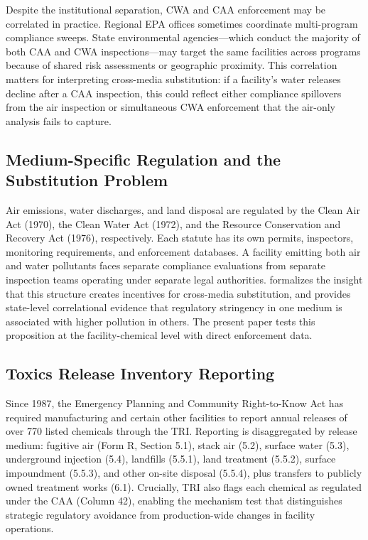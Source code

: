 \documentclass[12pt]{article}
\begin{document}
Despite the institutional separation, CWA and CAA enforcement may be correlated in practice. Regional EPA offices sometimes coordinate multi-program compliance sweeps. State environmental agencies---which conduct the majority of both CAA and CWA inspections---may target the same facilities across programs because of shared risk assessments or geographic proximity. This correlation matters for interpreting cross-media substitution: if a facility's water releases decline after a CAA inspection, this could reflect either compliance spillovers from the air inspection or simultaneous CWA enforcement that the air-only analysis fails to capture.

\subsection{Medium-Specific Regulation and the Substitution Problem}

Air emissions, water discharges, and land disposal are regulated by the Clean Air Act (1970), the Clean Water Act (1972), and the Resource Conservation and Recovery Act (1976), respectively. Each statute has its own permits, inspectors, monitoring requirements, and enforcement databases. A facility emitting both air and water pollutants faces separate compliance evaluations from separate inspection teams operating under separate legal authorities. \citet{sigman1996crossmedia} formalizes the insight that this structure creates incentives for cross-media substitution, and \citet{sigman2001crossmedia} provides state-level correlational evidence that regulatory stringency in one medium is associated with higher pollution in others. The present paper tests this proposition at the facility-chemical level with direct enforcement data.

\subsection{Toxics Release Inventory Reporting}

Since 1987, the Emergency Planning and Community Right-to-Know Act has required manufacturing and certain other facilities to report annual releases of over 770 listed chemicals through the TRI. Reporting is disaggregated by release medium: fugitive air (Form R, Section 5.1), stack air (5.2), surface water (5.3), underground injection (5.4), landfills (5.5.1), land treatment (5.5.2), surface impoundment (5.5.3), and other on-site disposal (5.5.4), plus transfers to publicly owned treatment works (6.1). Crucially, TRI also flags each chemical as regulated under the CAA (Column 42), enabling the mechanism test that distinguishes strategic regulatory avoidance from production-wide changes in facility operations.
\end{document}
